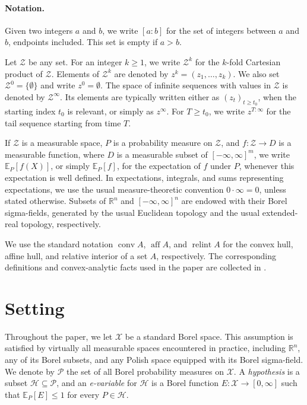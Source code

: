 \documentclass[10pt, a4paper]{article}
\newcommand{\E}{\mathbb E}
\newcommand{\Hh}{\mathcal H}
\newcommand{\PR}{\mathscr{P}}
\newcommand{\R}{\mathbb R}
\newcommand{\X}{\mathcal X}
\newcommand{\Z}{\mathcal Z}
\DeclareMathOperator{\aff}{aff}
\DeclareMathOperator{\conv}{conv}
\DeclareMathOperator{\relint}{relint}
\begin{document}
\paragraph{Notation.}
Given two integers $a$ and $b$, we write $[a:b]$ for the set of integers between $a$ and $b$, endpoints included. This set is empty if $a>b$.

Let $\Z$ be any set. For an integer $k\geq 1$, we write $\Z^k$ for the $k$-fold Cartesian product of $\Z$. Elements of $\Z^k$ are denoted by $z^k=(z_1,\dots,z_k)$. We also set $\Z^0=\{\emptyset\}$ and write $z^0=\emptyset$. The space of infinite sequences with values in $\Z$ is denoted by $\Z^\infty$. Its elements are typically written either as $(z_t)_{t\geq t_0}$, when the starting index $t_0$ is relevant, or simply as $z^\infty$. For $T\geq t_0$, we write $z^{T:\infty}$ for the tail sequence starting from time $T$.

If $\Z$ is a measurable space, $P$ is a probability measure on $\Z$, and $f:\Z\to D$ is a measurable function, where $D$ is a measurable subset of $[-\infty,\infty]^m$, we write $\E_P[f(X)]$, or simply $\E_P[f]$, for the expectation of $f$ under $P$, whenever this expectation is well defined. In expectations, integrals, and sums representing expectations, we use the usual measure-theoretic convention $0\cdot\infty=0$, unless stated otherwise. Subsets of $\R^n$ and $[-\infty,\infty]^n$ are endowed with their Borel sigma-fields, generated by the usual Euclidean topology and the usual extended-real topology, respectively.

We use the standard notation $\conv A$, $\aff A$, and $\relint A$ for the convex hull, affine hull, and relative interior of a set $A$, respectively. The corresponding definitions and convex-analytic facts used in the paper are collected in .
\section{Setting}
Throughout the paper, we let $\X$ be a standard Borel space. This assumption is satisfied by virtually all measurable spaces encountered in practice, including $\mathbb{R}^n$, any of its Borel subsets, and any Polish space equipped with its Borel sigma-field. We denote by $\PR$ the set of all Borel probability measures on $\X$. A \emph{hypothesis} is a subset $\Hh\subseteq \PR$, and an \emph{e-variable} for $\Hh$ is a Borel function $E:\X\to[0,\infty]$ such that $\E_P[E]\leq 1$ for every $P\in\Hh$.
\end{document}
